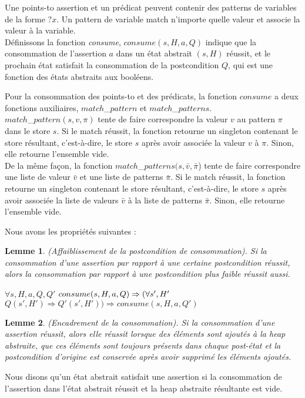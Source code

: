 \documentclass[11pt,openany]{article}
\newtheorem{lemme}{Lemme}
\begin{document}
	Une points-to assertion et un pr\'edicat peuvent contenir des patterns de variables de la forme $?x$. Un pattern de variable match n'importe quelle valeur et associe la valeur \`a la variable.\\
	D\'efinissons la fonction \textit{consume}, $consume(s,H,a,Q)$ indique que la consommation de l'assertion $a$ dans un \'etat abstrait $(s,H)$ r\'eussit, et le prochain \'etat satisfait la consommation de la postcondition $Q$, qui est une fonction des \'etats abstraits aux bool\'eens.\par
	Pour la consommation des points-to et des pr\'edicats, la fonction $consume$ a deux fonctions auxiliaires, $match$_$pattern$ et $match$_$patterns$.\\ $match$_$pattern(s,v,\pi)$ tente de faire correspondre la valeur $v$ au pattern $\pi$ dans le store $s$. Si le match r\'eussit, la fonction retourne un singleton contenant le store r\'esultant, c'est-\`a-dire, le store $s$ apr\`es avoir associ\'ee la valeur $v$ \`a $\pi$. Sinon, elle retourne l'ensemble vide.\\
	De la m\^eme fa\c{c}on, la fonction $match$_$patterns(s,\bar{v},\bar{\pi}$) tente de faire correspondre une liste de valeur $\bar{v}$ et une liste de patterns $\bar{\pi}$. Si le match r\'eussit, la fonction retourne un singleton contenant le store r\'esultant, c'est-\`a-dire, le store $s$ apr\`es avoir associ\'ee la liste de valeurs $\bar{v}$ \`a la liste de patterns $\bar{\pi}$. Sinon, elle retourne l'ensemble vide.\par
	
	Nous avons les propri\'et\'es suivantes :	
	
	\begin{lemme}
		(Affaiblissement de la postcondition de consommation). Si la consommation d'une assertion par rapport \`a une certaine postcondition  r\'eussit, alors la consommation par rapport \`a une postcondition plus faible r\'eussit aussi.\par
$\forall s,H,a,Q,Q'$ $consume(s,H,a,Q)\Rightarrow\\(\forall s', H'$ $Q(s',H')\Rightarrow Q'(s',H'))\Rightarrow consume(s,H,a,Q')$
	\end{lemme}
	
	\begin{lemme}
		(Encadrement de la consommation). Si la consommation d'une assertion r\'eussit, alors elle r\'eussit lorsque des \'el\'ements sont ajout\'es  \`a la heap abstraite, que ces \'el\'ements sont toujours pr\'esents dans chaque post-\'etat et la postcondition d'origine est conserv\'ee apr\`es avoir supprim\'e les \'el\'ements ajout\'es.
	\end{lemme}
	Nous disons qu'un \'etat abstrait satisfait une assertion si la consommation de l'assertion dans l'\'etat abstrait r\'eussit et la heap abstraite r\'esultante est vide.\\
	
\end{document}
